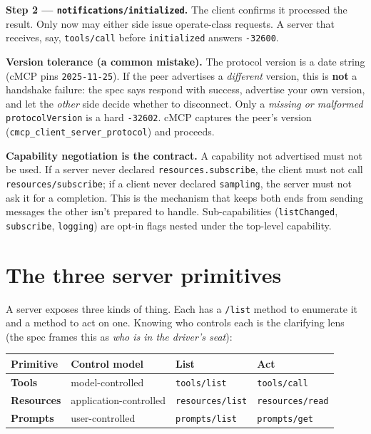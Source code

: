 \documentclass[10pt]{article}
\newcommand{\code}[1]{\texttt{\small #1}}
\begin{document}
\textbf{Step 2 --- \code{notifications/initialized}.} The client confirms it
processed the result. Only now may either side issue operate-class requests. A
server that receives, say, \code{tools/call} before \code{initialized} answers
\code{-32600}.

\textbf{Version tolerance (a common mistake).} The protocol version is a date
string (cMCP pins \code{2025-11-25}). If the peer advertises a \emph{different}
version, this is \textbf{not} a handshake failure: the spec says respond with
success, advertise your own version, and let the \emph{other} side decide whether
to disconnect. Only a \emph{missing or malformed} \code{protocolVersion} is a hard
\code{-32602}. cMCP captures the peer's version (\code{cmcp\_client\_server\_protocol})
and proceeds.

\textbf{Capability negotiation is the contract.} A capability not advertised must
not be used. If a server never declared \code{resources.subscribe}, the client
must not call \code{resources/subscribe}; if a client never declared
\code{sampling}, the server must not ask it for a completion. This is the
mechanism that keeps both ends from sending messages the other isn't prepared to
handle. Sub-capabilities (\code{listChanged}, \code{subscribe}, \code{logging})
are opt-in flags nested under the top-level capability.

\section{The three server primitives}

A server exposes three kinds of thing. Each has a \code{*/list} method to
enumerate it and a method to act on one. Knowing who controls each is the
clarifying lens (the spec frames this as \emph{who is in the driver's seat}):

\begin{center}\small
\begin{tabular}{l l l l}
\toprule
Primitive & Control model & List & Act \\
\midrule
\textbf{Tools}     & model-controlled    & \code{tools/list}     & \code{tools/call} \\
\textbf{Resources} & application-controlled & \code{resources/list} & \code{resources/read} \\
\textbf{Prompts}   & user-controlled     & \code{prompts/list}   & \code{prompts/get} \\
\bottomrule
\end{tabular}
\end{center}
\end{document}
